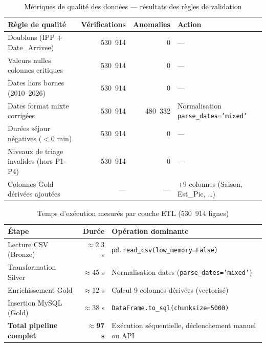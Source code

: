 \documentclass[12pt,a4paper]{report}
\begin{document}
	\begin{table}[H]
		\centering
		\caption{Métriques de qualité des données — résultats des règles de validation}
		\renewcommand{\arraystretch}{1.2}
		\begin{tabularx}{\textwidth}{Xrrl}
			\toprule
			\textbf{Règle de qualité} & \textbf{Vérifications} & \textbf{Anomalies} & \textbf{Action} \\
			\midrule
			Doublons (IPP + Date\_Arrivee)        & 530~914 & 0       & — \\
			Valeurs nulles colonnes critiques     & 530~914 & 0       & — \\
			Dates hors bornes (2010--2026)        & 530~914 & 0       & — \\
			Dates format mixte corrigées          & 530~914 & 480~332 & Normalisation \texttt{parse\_dates='mixed'} \\
			Durées séjour négatives ($<$0 min)    & 530~914 & 0       & — \\
			Niveaux de triage invalides (hors P1--P4) & 530~914 & 0   & — \\
			Colonnes Gold dérivées ajoutées       & —       & —       & +9 colonnes (Saison, Est\_Pic, …) \\
			\bottomrule
		\end{tabularx}
	\end{table}
	
	\begin{table}[H]
		\centering
		\caption{Temps d'exécution mesurés par couche ETL (530~914 lignes)}
		\renewcommand{\arraystretch}{1.2}
		\begin{tabularx}{\textwidth}{Xrl}
			\toprule
			\textbf{Étape} & \textbf{Durée} & \textbf{Opération dominante} \\
			\midrule
			Lecture CSV (Bronze)            & $\approx$2.3 s  & \texttt{pd.read\_csv(low\_memory=False)} \\
			Transformation Silver           & $\approx$45 s   & Normalisation dates (\texttt{parse\_dates='mixed'}) \\
			Enrichissement Gold             & $\approx$12 s   & Calcul 9 colonnes dérivées (vectorisé) \\
			Insertion MySQL (Gold)          & $\approx$38 s   & \texttt{DataFrame.to\_sql(chunksize=5000)} \\
			\textbf{Total pipeline complet} & \textbf{$\approx$97 s} & Exécution séquentielle, déclenchement manuel ou API \\
			\bottomrule
		\end{tabularx}
	\end{table}
	
\end{document}
